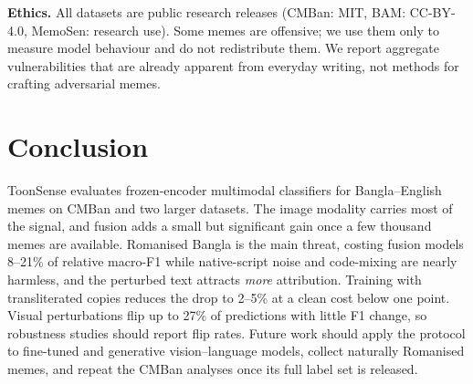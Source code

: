 \textbf{Ethics.} All datasets are public research releases (CMBan: MIT, BAM: CC-BY-4.0, MemoSen: research use). Some
memes are offensive; we use them only to measure model behaviour and do not redistribute them. We report aggregate
vulnerabilities that are already apparent from everyday writing, not methods for crafting adversarial memes.

\section{Conclusion}
\label{sec:conclusion}

ToonSense evaluates frozen-encoder multimodal classifiers for Bangla--English memes on CMBan and two larger datasets.
The image modality carries most of the signal, and fusion adds a small but significant gain once a few thousand
memes are available. Romanised Bangla is the main threat, costing fusion models 8--21\% of relative macro-F1 while
native-script noise and code-mixing are nearly harmless, and the perturbed text attracts \emph{more} attribution.
Training with transliterated copies reduces the drop to 2--5\% at a clean cost below one point. Visual perturbations
flip up to 27\% of predictions with little F1 change, so robustness studies should report flip rates. Future work
should apply the protocol to fine-tuned and generative vision--language models, collect naturally Romanised memes,
and repeat the CMBan analyses once its full label set is released.
